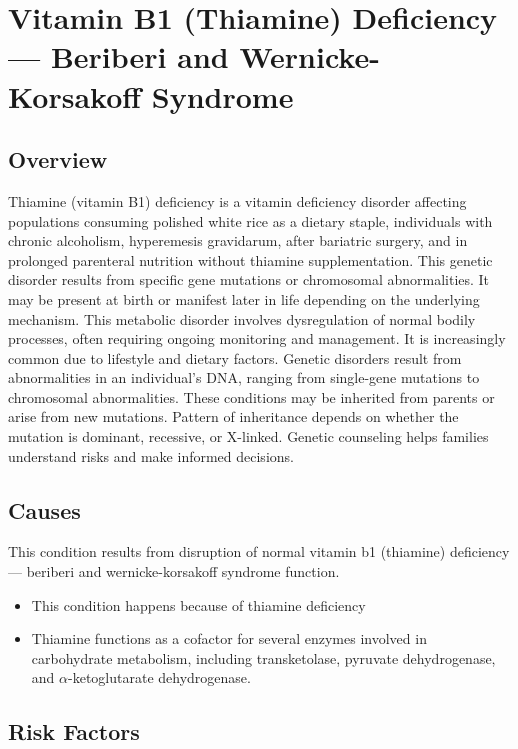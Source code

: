 \chapter{Vitamin B1 (Thiamine) Deficiency --- Beriberi and Wernicke-Korsakoff Syndrome}
\label{sec:Vitamin B1 Deficiency}

\section{Overview}
Thiamine (vitamin B1) deficiency is a vitamin deficiency disorder affecting populations consuming polished white rice as a dietary staple, individuals with chronic alcoholism, hyperemesis gravidarum, after bariatric surgery, and in prolonged parenteral nutrition without thiamine supplementation. This genetic disorder results from specific gene mutations or chromosomal abnormalities. It may be present at birth or manifest later in life depending on the underlying mechanism. This metabolic disorder involves dysregulation of normal bodily processes, often requiring ongoing monitoring and management. It is increasingly common due to lifestyle and dietary factors. Genetic disorders result from abnormalities in an individual's DNA, ranging from single-gene mutations to chromosomal abnormalities. These conditions may be inherited from parents or arise from new mutations. Pattern of inheritance depends on whether the mutation is dominant, recessive, or X-linked. Genetic counseling helps families understand risks and make informed decisions.
\section{Causes}
This condition results from disruption of normal vitamin b1 (thiamine) deficiency --- beriberi and wernicke-korsakoff syndrome function.

\begin{itemize}[noitemsep]
  \item This condition happens because of thiamine deficiency
  \item Thiamine functions as a cofactor for several enzymes involved in carbohydrate metabolism, including transketolase, pyruvate dehydrogenase, and $\alpha$-ketoglutarate dehydrogenase.
\end{itemize}
\section{Risk Factors}


